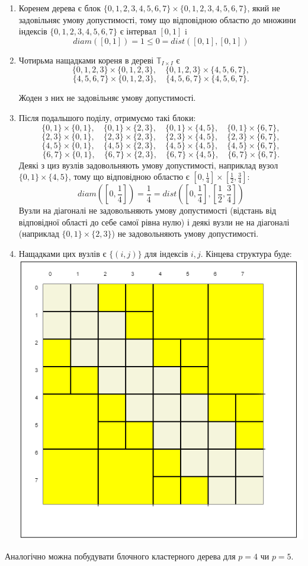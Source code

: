\documentclass[12pt]{report}
\begin{document}
	\begin{enumerate}
		\item Коренем дерева є блок $\{0,1,2,3,4,5,6,7\}\times\{0,1,2,3,4,5,6,7\}$, який не задовільняє умову допустимості, тому що відповідною областю до множини індексів $\{0,1,2,3,4,5,6,7\}$ є інтервал $[0,1]$ i $$diam([0,1])=1\le 0=dist([0,1],[0,1])$$
		\item Чотирьма нащадками кореня в дереві $\mathbb{T}_{I\times I}$ є
		$$\{0,1,2,3\}\times\{0,1,2,3\},\quad\{0,1,2,3\}\times\{4,5,6,7\},$$
		$$\{4,5,6,7\}\times\{0,1,2,3\},\quad\{4,5,6,7\}\times\{4,5,6,7\}.$$
		\par Жоден з них не задовільняє умову допустимості.
		\item Після подальшого поділу, отримуємо такі блоки:
		$$\{0,1\}\times\{0,1\},\quad\{0,1\}\times\{2,3\},\quad\{0,1\}\times\{4,5\},\quad\{0,1\}\times\{6,7\},$$
		$$\{2,3\}\times\{0,1\},\quad\{2,3\}\times\{2,3\},\quad\{2,3\}\times\{4,5\},\quad\{2,3\}\times\{6,7\},$$
		$$\{4,5\}\times\{0,1\},\quad\{4,5\}\times\{2,3\},\quad\{4,5\}\times\{4,5\},\quad\{4,5\}\times\{6,7\},$$
		$$\{6,7\}\times\{0,1\},\quad\{6,7\}\times\{2,3\},\quad\{6,7\}\times\{4,5\},\quad\{6,7\}\times\{6,7\}.$$
		Деякі з циз вузлів задовольняють умову допустимості, наприклад вузол $\{0,1\}\times\{4,5\}$, тому що відповідною областю є $[0,\frac{1}{4}]\times [\frac{1}{2},\frac{3}{4}]$:
		$$diam([0,\frac{1}{4}])=\frac{1}{4}=dist([0,\frac{1}{4}],[\frac{1}{2},\frac{3}{4}])$$
		Вузли на діагоналі не задовольняють умову допустимості (відстань від відповідної області до себе самої рівна нулю) і деякі вузли не на діагоналі (наприклад $\{0,1\}\times \{2,3\}$) не задовольняють умову допустимості.
		\item Нащадками цих вузлів є $\{(i,j)\}$ для індексів $i,j$. 
		Кінцева структура буде:
		\includegraphics[scale=0.5]{1_4}
	\end{enumerate}
	\par Аналогічно можна побудувати блочного кластерного дерева для $p=4$ чи $p=5$.
\end{document}

